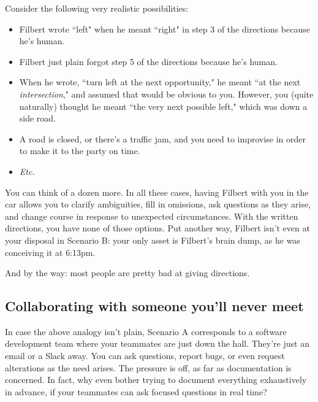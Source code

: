 Consider the following very realistic possibilities:

\begin{itemize}
\itemsep.1em

\item Filbert wrote ``left" when he meant ``right" in step 3 of the directions
because he's human.

\item Filbert just plain forgot step 5 of the directions because he's human.

\item When he wrote, ``turn left at the next opportunity," he meant ``at the
next \textit{intersection}," and assumed that would be obvious to you.
However, you (quite naturally) thought he meant ``the very next possible
left," which was down a side road.

\item A road is closed, or there's a traffic jam, and you need to improvise
in order to make it to the party on time.

\item \textit{Etc.}

\end{itemize}

You can think of a dozen more. In all these cases, having Filbert with you in
the car allows you to clarify ambiguities, fill in omissions, ask questions as
they arise, and change course in response to unexpected circumstances. With
the written directions, you have none of those options. Put another way,
Filbert isn't even at your disposal in Scenario B: your only asset is
Filbert's brain dump, as he was conceiving it at 6:13pm.

And by the way: most people are pretty bad at giving directions.

\subsection{Collaborating with someone you'll never meet}

In case the above analogy isn't plain, Scenario A corresponds to a software
development team where your teammates are just down the hall. They're just an
email or a Slack away. You can ask questions, report bugs, or even request
alterations as the need arises. The pressure is off, as far as documentation
is concerned. In fact, why even bother trying to document everything
exhaustively in advance, if your teammates can ask focused questions in real
time?

